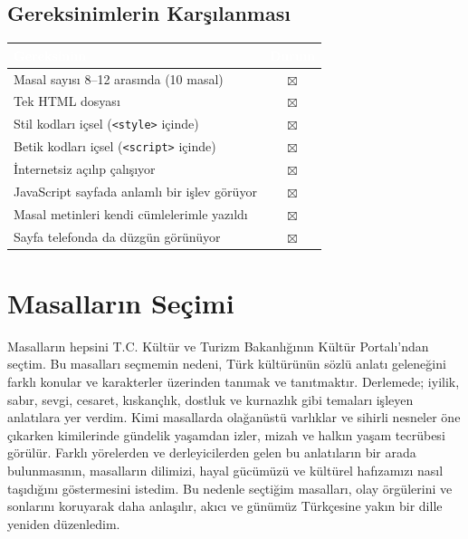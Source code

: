 \documentclass[12pt,a4paper]{article}
\begin{document}
\subsection{Gereksinimlerin Karşılanması}
\begin{center}
\begin{tabular}{@{}p{8.2cm}c@{}}
\toprule
\rowcolor{ana}\textcolor{white}{\textbf{Gereksinim}} & \textcolor{white}{\textbf{Durum}} \\
\midrule
Masal sayısı 8--12 arasında (10 masal)         & $\boxtimes$ \\
Tek HTML dosyası                                    & $\boxtimes$ \\
Stil kodları içsel (\texttt{<style>} içinde)        & $\boxtimes$ \\
Betik kodları içsel (\texttt{<script>} içinde)      & $\boxtimes$ \\
İnternetsiz açılıp çalışıyor                        & $\boxtimes$ \\
JavaScript sayfada anlamlı bir işlev görüyor        & $\boxtimes$ \\
Masal metinleri kendi cümlelerimle yazıldı          & $\boxtimes$ \\
Sayfa telefonda da düzgün görünüyor                 & $\boxtimes$ \\
\bottomrule
\end{tabular}
\end{center}

\section{Masalların Seçimi}
Masalların hepsini T.C. Kültür ve Turizm Bakanlığının Kültür Portalı'ndan seçtim. Bu masalları seçmemin nedeni, Türk kültürünün sözlü anlatı geleneğini farklı konular ve karakterler üzerinden tanımak ve tanıtmaktır. Derlemede; iyilik, sabır, sevgi, cesaret, kıskançlık, dostluk ve kurnazlık gibi temaları işleyen anlatılara yer verdim. Kimi masallarda olağanüstü varlıklar ve sihirli nesneler öne çıkarken kimilerinde gündelik yaşamdan izler, mizah ve halkın yaşam tecrübesi görülür. Farklı yörelerden ve derleyicilerden gelen bu anlatıların bir arada bulunmasının, masalların dilimizi, hayal gücümüzü ve kültürel hafızamızı nasıl taşıdığını göstermesini istedim. Bu nedenle seçtiğim masalları, olay örgülerini ve sonlarını koruyarak daha anlaşılır, akıcı ve günümüz Türkçesine yakın bir dille yeniden düzenledim.
\end{document}
